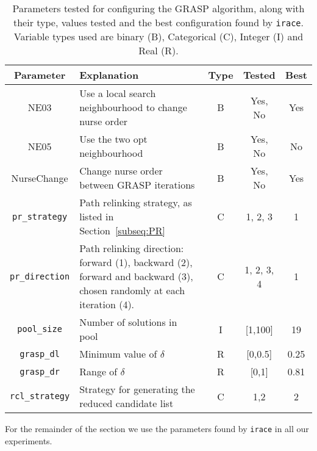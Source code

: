 \documentclass[a4paper,11pt]{elsarticle}
\begin{document}
\begin{table}[h]
    \centering
    \caption{Parameters tested for configuring the GRASP algorithm, along with their type, values tested and the best configuration found by \texttt{irace}. Variable types used are binary (B), Categorical (C), Integer (I) and Real (R).}
    \begin{tabular}{cp{5.5cm}ccc}
    \hline
    \textbf{Parameter}& \textbf{Explanation}  & \textbf{Type} & \textbf{Tested} & \textbf{Best} \\
    \hline
    NE03                    & Use a local search neighbourhood to change nurse order & B & Yes, No               &  Yes  \\ %
    NE05                    &   Use the two opt neighbourhood & B & Yes, No                           & No   \\ %
    NurseChange             &   Change nurse order between GRASP iterations & B & Yes, No                        &  Yes  \\ %
    \texttt{pr\_strategy}   &  Path relinking strategy, as listed in Section~\ref{subseq:PR}& C & 1, 2, 3   &   1 \\ %
    \texttt{pr\_direction}  &   Path relinking direction: forward (1), backward (2), forward and backward (3), chosen randomly at each iteration (4).& C & 1, 2, 3, 4       &   1 \\ %
    \texttt{pool\_size}     &  Number of solutions in pool & I & [1,100]                                            & 19    \\ %
    \texttt{grasp\_dl}              & Minimum value of $\delta$ &   R & [0,0.5]                                     & 0.25  \\ %
    \texttt{grasp\_dr}              & Range of $\delta$ &   R & [0,1]                                               & 0.81\\ %
    \texttt{rcl\_strategy}          & Strategy for generating the reduced candidate list & C & 1,2          & 2 \\ %
    \hline
    \end{tabular}
    \label{tab:parameters}
\end{table}

For the remainder of the section we use the parameters found by \texttt{irace} in all our experiments.
\end{document}
